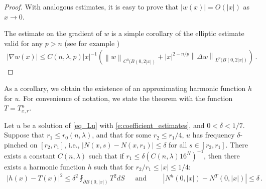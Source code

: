 \documentclass[11pt]{article}
\begin{document}
\begin{proof}
With analogous estimates, it is easy to prove that ${\left|{w(x)}\right|} = O({\left|x\right|})$ as $x\to 0$.

The estimate on the gradient of $w$ is a simple corollary of the elliptic estimate valid for any $p>n$ (see for example \cite[Theorem 9.11]{GT})
\begin{gather}
 {\left|{\nabla w(x)}\right|}\leq C(n,\lambda,p) {\left|x\right|} ^{-1} {\left({{\left\|{w}\right\|}_{C^0(B(0,2{\left|x\right|})} + {\left|x\right|} ^{2-n/p} {\left\|{\Delta w}\right\|}_{L^p(B(0,2{\left|x\right|})} }\right)}\, .
\end{gather}
\end{proof}

As a corollary, we obtain the existence of an approximating harmonic function $h$ for $u$. For convenience of notation, we state the theorem with the function $T=T^u_{x,r}$.
\begin{corollary}\label{cor_ell1}
 Let $u$ be a solution of \eqref{eq_Lu} with \eqref{e:coefficient_estimates}, and $0<\delta<1/7$. Suppose that $r_1\leq r_0(n,\lambda)$, and that for some $r_2\leq r_1/4$, $u$ has frequency $\delta$-pinched on $[r_2,r_1]$, i.e., ${\left|{N(x,s)-N(x,r_1)}\right|}\leq \delta$ for all $s\in [r_2,r_1]$. There exists a constant $C(n,\lambda)$ such that if $r_1\leq \delta {\left({C(n,\lambda) 16^N}\right)}^{-1}$, then there exists a harmonic function $h$ such that for $r_2/r_1\leq {\left|x\right|} \leq 1/4$:
 \begin{gather}
  {\left|{h(x)-T(x)}\right|}^2\leq \delta^2 \fint_{\partial B(0,{\left|x\right|})} T^2 dS \, \quad \text{ and }\quad \quad  {\left|{N^h(0,{\left|x\right|})- N^T(0,{\left|x\right|})}\right|} \leq \delta\, .
 \end{gather}
\end{corollary}
\end{document}
